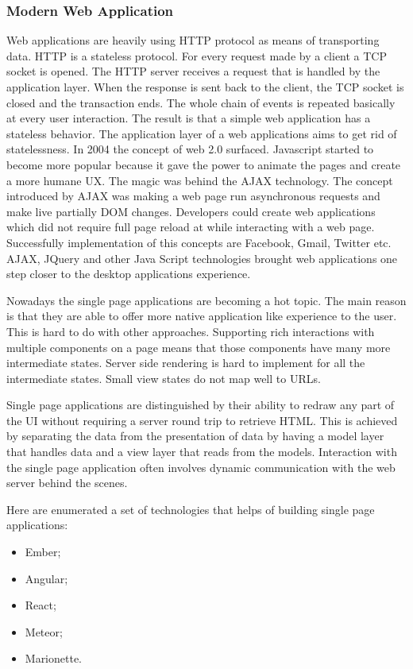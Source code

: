 \subsubsection{Modern Web Application}
Web applications are heavily using HTTP protocol as means of transporting data. HTTP is a stateless protocol. For every request made by a client a TCP socket is opened. The HTTP server receives a request that is handled by the application layer. When the response is sent back to the client, the TCP socket is closed and the transaction ends. The whole chain of events is repeated basically at every user interaction. The result is that a simple web application has a stateless behavior. The application layer of a web applications aims to get rid of statelessness. In 2004 the concept of web 2.0 surfaced. Javascript started to become more popular because it gave the power to animate the pages and create a more humane UX. The magic was behind the AJAX technology. The concept introduced by AJAX was making a web page run asynchronous requests and make live partially DOM changes. Developers could create web applications which did not require full page reload at while interacting with a web page. Successfully implementation of this concepts are Facebook, Gmail, Twitter etc. AJAX, JQuery and other Java Script technologies brought web applications one step closer to the desktop applications experience.

Nowadays the single page applications are becoming a hot topic. The main reason is that they are able to offer more native application like experience to the user. This is hard to do with other approaches. Supporting rich interactions with multiple components on a page means that those components have many more intermediate states. Server side rendering is hard to implement for all the intermediate states. Small view states do not map well to URLs.

Single page applications are distinguished by their ability to redraw any part of the UI without requiring a server round trip to retrieve HTML. This is achieved by separating the data from the presentation of data by having a model layer that handles data and a view layer that reads from the models. Interaction with the single page application often involves dynamic communication with the web server behind the scenes.

Here are enumerated a set of technologies that helps of building single page applications:
\begin{itemize}
    \item Ember;
    \item Angular;
    \item React;
    \item Meteor;
    \item Marionette.
\end{itemize}

